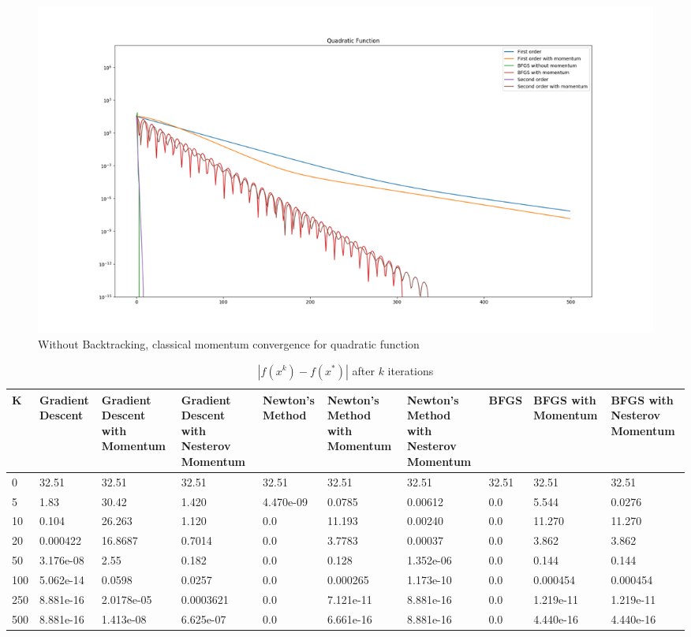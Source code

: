 \documentclass{article}
\begin{document}
\begin{center}
\begin{figure}[H]
	\includegraphics[width=\linewidth]{../Images/quadraticmomentum1.png}
	\caption{Without Backtracking, classical momentum convergence for quadratic function}
	\label{fig:Without Backtracking, classical momentum convergence for quadratic function}
\end{figure}
\tiny{
\begin{table}[H]
	\centering
	\caption{$ | f(x^k) - f(x^*) | $ after $k$ iterations}
	\label{Quadratic function table}
	\begin{tabular}{|l|p{1.2cm}|p{1.2cm}|p{1.2cm}|p{1.2cm}|p{1.2cm}|p{1.2cm}|p{1.2cm}|p{1.2cm}|p{1.2cm}|}
		\hline
		K & Gradient Descent & Gradient Descent with Momentum & Gradient Descent with Nesterov Momentum & Newton's Method & Newton's Method with Momentum & Newton's Method with Nesterov Momentum & BFGS & BFGS with Momentum & BFGS with Nesterov Momentum \\
		\hline
		0 & 32.51 & 32.51 & 32.51 & 32.51 & 32.51 & 32.51 & 32.51 & 32.51 & 32.51 \\
		\hline
		5 & 1.83 & 30.42 & 1.420 & 4.470e-09 & 0.0785 & 0.00612 & 0.0 & 5.544 & 0.0276 \\
		\hline
		10 & 0.104 & 26.263 & 1.120 & 0.0 & 11.193 & 0.00240 & 0.0 & 11.270 & 11.270 \\
		\hline
		20 & 0.000422 & 16.8687 & 0.7014 & 0.0 & 3.7783 & 0.00037 & 0.0 & 3.862 & 3.862 \\
		\hline
		50 & 3.176e-08 & 2.55 & 0.182 & 0.0 & 0.128 & 1.352e-06 & 0.0 & 0.144 & 0.144 \\
		\hline
		100 & 5.062e-14 & 0.0598 & 0.0257 & 0.0 & 0.000265 & 1.173e-10 & 0.0 & 0.000454 & 0.000454 \\
		\hline
		250 & 8.881e-16 & 2.0178e-05 & 0.0003621 & 0.0 & 7.121e-11 & 8.881e-16 & 0.0 & 1.219e-11 & 1.219e-11 \\
		\hline
		500 & 8.881e-16 & 1.413e-08 & 6.625e-07 & 0.0 & 6.661e-16 & 8.881e-16 & 0.0 & 4.440e-16 & 4.440e-16 \\
		\hline
	\end{tabular}
\end{table}}


\end{center}
\end{document}
